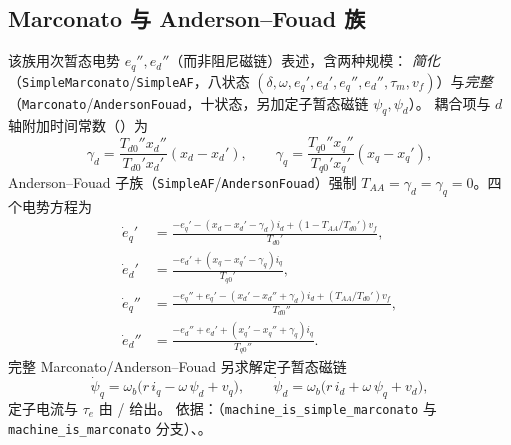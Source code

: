 \subsection{Marconato 与 Anderson--Fouad 族}
\label{sec:dynamics-machine-marconato}
该族用次暂态电势 $e_q'',e_d''$（而非阻尼磁链）表述，含两种规模：
\emph{简化}（\texttt{SimpleMarconato}/\texttt{SimpleAF}，八状态
$(\delta,\omega,e_q',e_d',e_q'',e_d'',\tau_m,v_f)$）与\emph{完整}
（\texttt{Marconato}/\texttt{AndersonFouad}，十状态，另加定子暂态磁链 $\psi_q,\psi_d$）。
耦合项与 $d$ 轴附加时间常数（）为
\begin{equation}
 \gamma_d=\frac{T_{d0}''x_d''}{T_{d0}'x_d'}(x_d-x_d'),\qquad
 \gamma_q=\frac{T_{q0}''x_q''}{T_{q0}'x_q'}(x_q-x_q'),
\end{equation}
Anderson--Fouad 子族（\texttt{SimpleAF}/\texttt{AndersonFouad}）强制
$T_{AA}=\gamma_d=\gamma_q=0$。四个电势方程为
\begin{align}
 \dot e_q' &= \frac{-e_q'-(x_d-x_d'-\gamma_d)i_d+(1-T_{AA}/T_{d0}')v_f}{T_{d0}'},\\
 \dot e_d' &= \frac{-e_d'+(x_q-x_q'-\gamma_q)i_q}{T_{q0}'},\\
 \dot e_q'' &= \frac{-e_q''+e_q'-(x_d'-x_d''+\gamma_d)i_d+(T_{AA}/T_{d0}')v_f}{T_{d0}''},\\
 \dot e_d'' &= \frac{-e_d''+e_d'+(x_q'-x_q''+\gamma_q)i_q}{T_{q0}''}.
\end{align}
完整 Marconato/Anderson--Fouad 另求解定子暂态磁链
\begin{equation}
 \dot\psi_q=\omega_b\big(r\,i_q-\omega\,\psi_d+v_q\big),\qquad
 \dot\psi_d=\omega_b\big(r\,i_d+\omega\,\psi_q+v_d\big),
\end{equation}
定子电流与 $\tau_e$ 由  /  给出。
依据：（\texttt{machine\_is\_simple\_marconato} 与
\texttt{machine\_is\_marconato} 分支）、。

